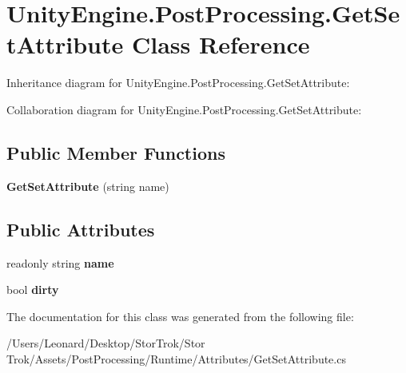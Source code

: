 \hypertarget{class_unity_engine_1_1_post_processing_1_1_get_set_attribute}{}\section{Unity\+Engine.\+Post\+Processing.\+Get\+Set\+Attribute Class Reference}
\label{class_unity_engine_1_1_post_processing_1_1_get_set_attribute}


Inheritance diagram for Unity\+Engine.\+Post\+Processing.\+Get\+Set\+Attribute\+:


Collaboration diagram for Unity\+Engine.\+Post\+Processing.\+Get\+Set\+Attribute\+:
\subsection*{Public Member Functions}
\begin{DoxyCompactItemize}
\item 
\mbox{\label{class_unity_engine_1_1_post_processing_1_1_get_set_attribute_a28be93611db1068a1341cd9d376a882c}} 
{\bfseries Get\+Set\+Attribute} (string name)
\end{DoxyCompactItemize}
\subsection*{Public Attributes}
\begin{DoxyCompactItemize}
\item 
\mbox{\label{class_unity_engine_1_1_post_processing_1_1_get_set_attribute_a177f3551073d0f862d77969abb40af98}} 
readonly string {\bfseries name}
\item 
\mbox{\label{class_unity_engine_1_1_post_processing_1_1_get_set_attribute_a370ea457f8789fd73e72f44bca0a1baf}} 
bool {\bfseries dirty}
\end{DoxyCompactItemize}


The documentation for this class was generated from the following file\+:\begin{DoxyCompactItemize}
\item 
/\+Users/\+Leonard/\+Desktop/\+Stor\+Trok/\+Stor Trok/\+Assets/\+Post\+Processing/\+Runtime/\+Attributes/Get\+Set\+Attribute.\+cs\end{DoxyCompactItemize}
